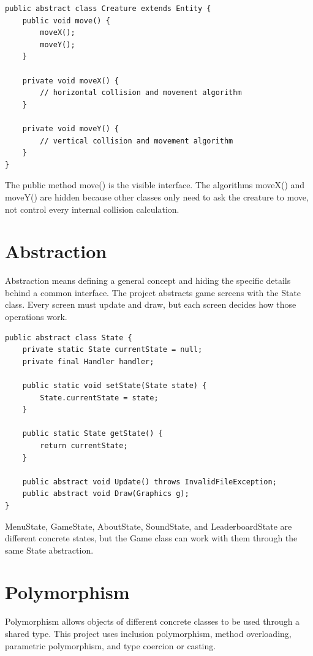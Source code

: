 \documentclass[12pt,a4paper]{article}
\begin{document}
\begin{lstlisting}
public abstract class Creature extends Entity {
    public void move() {
        moveX();
        moveY();
    }

    private void moveX() {
        // horizontal collision and movement algorithm
    }

    private void moveY() {
        // vertical collision and movement algorithm
    }
}
\end{lstlisting}

The public method move() is the visible interface. The algorithms moveX() and moveY() are hidden because other classes only need to ask the creature to move, not control every internal collision calculation.


\section*{Abstraction}
Abstraction means defining a general concept and hiding the specific details behind a common interface. The project abstracts game screens with the State class. Every screen must update and draw, but each screen decides how those operations work.

\begin{lstlisting}
public abstract class State {
    private static State currentState = null;
    private final Handler handler;

    public static void setState(State state) {
        State.currentState = state;
    }

    public static State getState() {
        return currentState;
    }

    public abstract void Update() throws InvalidFileException;
    public abstract void Draw(Graphics g);
}
\end{lstlisting}

MenuState, GameState, AboutState, SoundState, and LeaderboardState are different concrete states, but the Game class can work with them through the same State abstraction.


\section*{Polymorphism}
Polymorphism allows objects of different concrete classes to be used through a shared type. This project uses inclusion polymorphism, method overloading, parametric polymorphism, and type coercion or casting.
\end{document}
